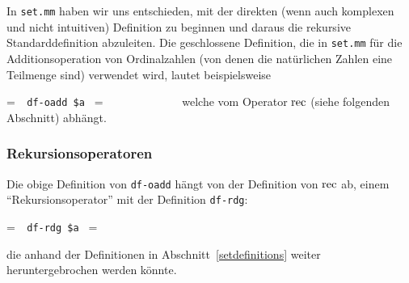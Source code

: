 In \texttt{set.mm} haben wir uns entschieden, mit der direkten (wenn auch komplexen und nicht intuitiven) Definition zu beginnen und daraus die rekursive Standarddefinition abzuleiten. Die geschlossene Definition, die in \texttt{set.mm} für die Additionsoperation von Ordinalzahlen (von denen die natürlichen Zahlen eine Teilmenge sind) verwendet wird, lautet beispielsweise

\setbox\startprefix=\hbox{\tt \ \ df-oadd\ \$a\ }
\setbox\contprefix=\hbox{\tt \ \ \ \ \ \ \ \ \ \ \ \ \ }
\startm
\m{\vdash}\m{=}\m{(}\m{\in}\m{,}\m{\in}\m{\mapsto}\m{(}\m{(}\m{(}\m{\in}\m{\mapsto}\m{)}\m{,}\m{)}\m{)}\m{)}
\endm
\noindent welche vom Operator ${\rm rec}$ (siehe folgenden Abschnitt) abhängt.

\subsubsection{Rekursionsoperatoren}

Die obige Definition von \texttt{df-oadd} hängt von der Definition von ${\rm rec}$ ab, einem "`Rekursionsoperator"' mit der Definition \texttt{df-rdg}:

\setbox\startprefix=\hbox{\tt \ \ df-rdg\ \$a\ }
\setbox\contprefix=\hbox{\tt \ \ \ \ \ \ \ \ \ \ \ \ }
\startm
\m{\vdash}\m{(}\m{,}\m{)}\m{=}\m{(}\m{(}\m{\in}\m{\mapsto}\m{(}\m{=}\m{\varnothing}\m{,}\m{,}\m{(}\m{,}\m{\bigcup}\m{,}\m{(}\m{(}\m{\bigcup}\m{)}\m{)}\m{)}\m{)}\m{)}\m{)}
\endm

\noindent die anhand der Definitionen in Abschnitt~\ref{setdefinitions} weiter heruntergebrochen werden könnte.

